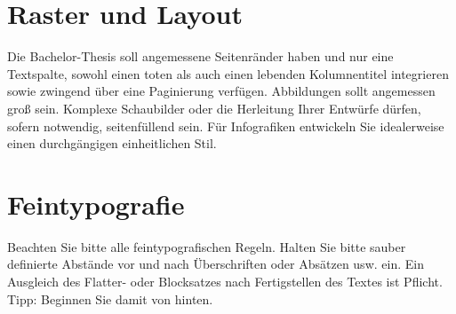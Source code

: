 \section*{Raster und Layout}

Die Bachelor-Thesis soll angemessene Seitenränder haben und nur eine Textspalte, sowohl einen toten als auch einen lebenden Kolumnentitel integrieren sowie zwingend über eine Paginierung verfügen. Abbildungen sollt angemessen groß sein. Komplexe Schaubilder oder die Herleitung Ihrer Entwürfe dürfen, sofern notwendig, seitenfüllend sein. Für Infografiken entwickeln Sie idealerweise einen durchgängigen einheitlichen Stil.

\section*{Feintypografie}

Beachten Sie bitte alle feintypografischen Regeln. Halten Sie bitte sauber definierte Abstände vor und nach Überschriften oder Absätzen usw. ein. Ein Ausgleich des Flatter- oder Blocksatzes nach Fertigstellen des Textes ist Pflicht. Tipp: Beginnen Sie damit von hinten.
